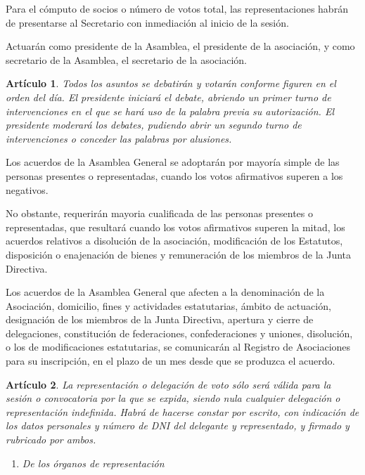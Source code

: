 \documentclass[a4paper,12pt]{article}
\theoremstyle{mystyle}		%
\newtheorem{art}{Artículo}	%
\begin{document}
\begin{onehalfspace}
Para el cómputo de socios o número de votos total, las representaciones habrán de presentarse al Secretario con inmediación al inicio de la sesión.

Actuarán como presidente de la Asamblea, el presidente de la asociación, y como secretario de la Asamblea, el secretario de la asociación.

\begin{art}
Todos los asuntos se debatirán y votarán conforme figuren en el orden del día. El presidente iniciará el debate, abriendo un primer turno de intervenciones en el que se hará uso de la palabra previa su autorización. El presidente moderará los debates, pudiendo abrir un segundo turno de intervenciones o conceder las palabras por alusiones.
\end{art}

Los acuerdos de la Asamblea General se adoptarán por mayoría simple de las personas presentes o representadas, cuando los votos afirmativos superen a los negativos.

No obstante, requerirán mayoria cualificada de las personas presentes o representadas, que resultará cuando los votos afirmativos superen la mitad, los acuerdos relativos a disolución de la asociación, modificación de los Estatutos, disposición o enajenación de bienes y remuneración de los miembros de la Junta Directiva.

Los acuerdos de la Asamblea General que afecten a la denominación de la Asociación, domicilio, fines y actividades estatutarias, ámbito de actuación, designación de los miembros de la Junta Directiva, apertura y cierre de delegaciones, constitución de federaciones, confederaciones y uniones, disolución, o los de modificaciones estatutarias, se comunicarán al Registro de Asociaciones para su inscripción, en el plazo de un mes desde que se produzca el acuerdo.

\begin{art}
La representación o delegación de voto sólo será válida para la sesión o convocatoria por la que se expida, siendo nula cualquier delegación o representación indefinida. Habrá de hacerse constar por escrito, con indicación de los datos personales y número de DNI del delegante y representado, y firmado y rubricado por ambos.
\end{art}

\begin{enumerate}[resume*=seccion]
 \item \textit{De los órganos de representación}
\end{enumerate}


\end{onehalfspace}
\end{document}

